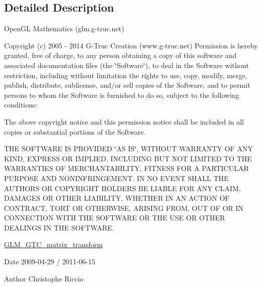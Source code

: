 \subsection{Detailed Description}
Open\-G\-L Mathematics (glm.\-g-\/truc.\-net)

Copyright (c) 2005 -\/ 2014 G-\/\-Truc Creation (www.\-g-\/truc.\-net) Permission is hereby granted, free of charge, to any person obtaining a copy of this software and associated documentation files (the \char`\"{}\-Software\char`\"{}), to deal in the Software without restriction, including without limitation the rights to use, copy, modify, merge, publish, distribute, sublicense, and/or sell copies of the Software, and to permit persons to whom the Software is furnished to do so, subject to the following conditions\-:

The above copyright notice and this permission notice shall be included in all copies or substantial portions of the Software.

T\-H\-E S\-O\-F\-T\-W\-A\-R\-E I\-S P\-R\-O\-V\-I\-D\-E\-D \char`\"{}\-A\-S I\-S\char`\"{}, W\-I\-T\-H\-O\-U\-T W\-A\-R\-R\-A\-N\-T\-Y O\-F A\-N\-Y K\-I\-N\-D, E\-X\-P\-R\-E\-S\-S O\-R I\-M\-P\-L\-I\-E\-D, I\-N\-C\-L\-U\-D\-I\-N\-G B\-U\-T N\-O\-T L\-I\-M\-I\-T\-E\-D T\-O T\-H\-E W\-A\-R\-R\-A\-N\-T\-I\-E\-S O\-F M\-E\-R\-C\-H\-A\-N\-T\-A\-B\-I\-L\-I\-T\-Y, F\-I\-T\-N\-E\-S\-S F\-O\-R A P\-A\-R\-T\-I\-C\-U\-L\-A\-R P\-U\-R\-P\-O\-S\-E A\-N\-D N\-O\-N\-I\-N\-F\-R\-I\-N\-G\-E\-M\-E\-N\-T. I\-N N\-O E\-V\-E\-N\-T S\-H\-A\-L\-L T\-H\-E A\-U\-T\-H\-O\-R\-S O\-R C\-O\-P\-Y\-R\-I\-G\-H\-T H\-O\-L\-D\-E\-R\-S B\-E L\-I\-A\-B\-L\-E F\-O\-R A\-N\-Y C\-L\-A\-I\-M, D\-A\-M\-A\-G\-E\-S O\-R O\-T\-H\-E\-R L\-I\-A\-B\-I\-L\-I\-T\-Y, W\-H\-E\-T\-H\-E\-R I\-N A\-N A\-C\-T\-I\-O\-N O\-F C\-O\-N\-T\-R\-A\-C\-T, T\-O\-R\-T O\-R O\-T\-H\-E\-R\-W\-I\-S\-E, A\-R\-I\-S\-I\-N\-G F\-R\-O\-M, O\-U\-T O\-F O\-R I\-N C\-O\-N\-N\-E\-C\-T\-I\-O\-N W\-I\-T\-H T\-H\-E S\-O\-F\-T\-W\-A\-R\-E O\-R T\-H\-E U\-S\-E O\-R O\-T\-H\-E\-R D\-E\-A\-L\-I\-N\-G\-S I\-N T\-H\-E S\-O\-F\-T\-W\-A\-R\-E.

\hyperlink{group__gtc__matrix__transform}{G\-L\-M\-\_\-\-G\-T\-C\-\_\-matrix\-\_\-transform}

\begin{DoxyDate}{Date}
2009-\/04-\/29 / 2011-\/06-\/15 
\end{DoxyDate}
\begin{DoxyAuthor}{Author}
Christophe Riccio 
\end{DoxyAuthor}
